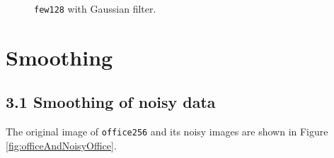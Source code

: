 \documentclass[11pt,a4paper]{article}
\begin{document}
\begin{itemize}
\begin{figure}[!ht]
		\caption{\texttt{few128} with Gaussian filter.}
		\label{fig:Q16Few}
	\end{figure}
\end{itemize}

\section{Smoothing}
\subsection*{3.1 Smoothing of noisy data}
\par The original image of \texttt{office256} and its noisy images are shown in Figure \ref{fig:officeAndNoisyOffice}.
\end{document}
